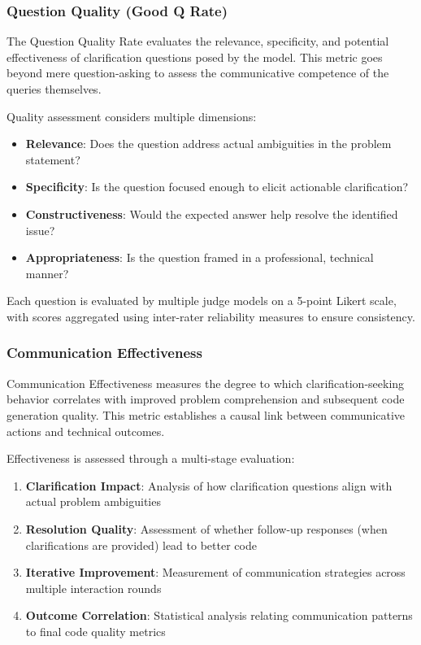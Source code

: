 \documentclass[conference]{IEEEtran}
\begin{document}
\subsubsection{Question Quality (Good Q Rate)}

The Question Quality Rate evaluates the relevance, specificity, and potential effectiveness of clarification questions posed by the model. This metric goes beyond mere question-asking to assess the communicative competence of the queries themselves.

Quality assessment considers multiple dimensions:
\begin{itemize}
    \item \textbf{Relevance}: Does the question address actual ambiguities in the problem statement?
    \item \textbf{Specificity}: Is the question focused enough to elicit actionable clarification?
    \item \textbf{Constructiveness}: Would the expected answer help resolve the identified issue?
    \item \textbf{Appropriateness}: Is the question framed in a professional, technical manner?
\end{itemize}

Each question is evaluated by multiple judge models on a 5-point Likert scale, with scores aggregated using inter-rater reliability measures to ensure consistency.

\subsubsection{Communication Effectiveness}

Communication Effectiveness measures the degree to which clarification-seeking behavior correlates with improved problem comprehension and subsequent code generation quality. This metric establishes a causal link between communicative actions and technical outcomes.

Effectiveness is assessed through a multi-stage evaluation:
\begin{enumerate}
    \item \textbf{Clarification Impact}: Analysis of how clarification questions align with actual problem ambiguities
    \item \textbf{Resolution Quality}: Assessment of whether follow-up responses (when clarifications are provided) lead to better code
    \item \textbf{Iterative Improvement}: Measurement of communication strategies across multiple interaction rounds
    \item \textbf{Outcome Correlation}: Statistical analysis relating communication patterns to final code quality metrics
\end{enumerate}
\end{document}
